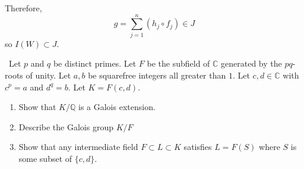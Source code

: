 \documentclass[12pt]{Qual}
\begin{document}
\begin{solution}
\begin{enumerate}[label=(\alph*)]
    Therefore, $$g= \sum_{j=1}^n(h_j\circ f_j)\in J$$ so $I(W)\subset J.$

\end{enumerate}
\end{solution}
\newpage



\begin{problem} $\,$
Let $p$ and $q$ be distinct primes. Let $F$ be the subfield of $\mathbb{C}$ generated by the $pq$-roots of unity. Let $a,b$ be squarefree integers all greater than $1.$ Let $c,d\in\mathbb{C}$ with $c^p=a$ and $d^q=b.$ Let $K=F(c,d).$
\begin{enumerate}[label=(\alph*)]
    \item Show that $K/\mathbb{Q}$ is a Galois extension.
    \item Describe the Galois group $K/F$
    \item Show that any intermediate field $F\subset L\subset K$ satisfies $L=F(S)$ where $S$ is some subset of $\{c,d\}.$
\end{enumerate}
\end{problem}
\end{document}
